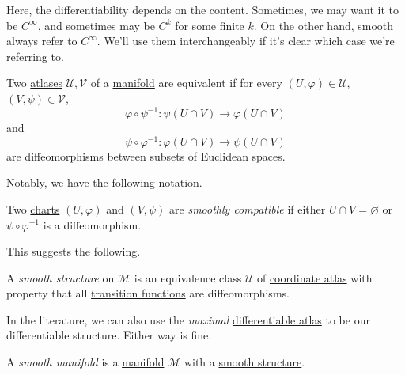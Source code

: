 \begin{remark}
	Here, the differentiability depends on the content. Sometimes, we may want it to be \(C^{\infty} \), and sometimes may be \(C^k\) for some finite \(k\). On the other hand, smooth always refer to \(C^{\infty} \). We'll use them interchangeably if it's clear which case we're referring to.
\end{remark}

\begin{definition}\label{def:equivalence-atlas}
	Two \hyperref[def:atlas]{atlases} \(\mathcal{U} , \mathcal{V} \) of a \hyperref[def:topological-manifold]{manifold} are equivalent if for every \((U, \varphi)\in \mathcal{U} \), \((V, \psi)\in \mathcal{V} \),
	\[
		\varphi \circ \psi ^{-1} \colon \psi(U \cap V) \to \varphi (U \cap V)
	\]
	and
	\[
		\psi \circ \varphi ^{-1} \colon \varphi (U \cap V) \to \psi(U \cap V)
	\]
	are diffeomorphisms between subsets of Euclidean spaces.
\end{definition}

Notably, we have the following notation.

\begin{notation}\label{not:smoothly-compatible}
	Two \hyperref[def:coordinate-chart]{charts} \((U, \varphi )\) and \((V, \psi)\) are \emph{smoothly compatible} if either \(U \cap V = \varnothing \) or \(\psi \circ \varphi ^{-1} \) is a diffeomorphism.
\end{notation}

This suggests the following.

\begin{definition}\label{def:smooth-structure}
	A \emph{smooth structure} on \(\mathcal{M} \) is an equivalence class \(\mathcal{U} \) of \hyperref[def:atlas]{coordinate atlas} with property that all \hyperref[def:coordinate-transition]{transition functions} are diffeomorphisms.
\end{definition}

\begin{remark}
	In the literature, we can also use the \emph{maximal} \hyperref[def:differentiable-atlas]{differentiable atlas} to be our differentiable structure. Either way is fine.
\end{remark}

\begin{definition}\label{def:smooth-manifold}
	A \emph{smooth manifold} is a \hyperref[def:topological-manifold]{manifold} \(\mathcal{M} \) with a \hyperref[def:smooth-structure]{smooth structure}.
\end{definition}

